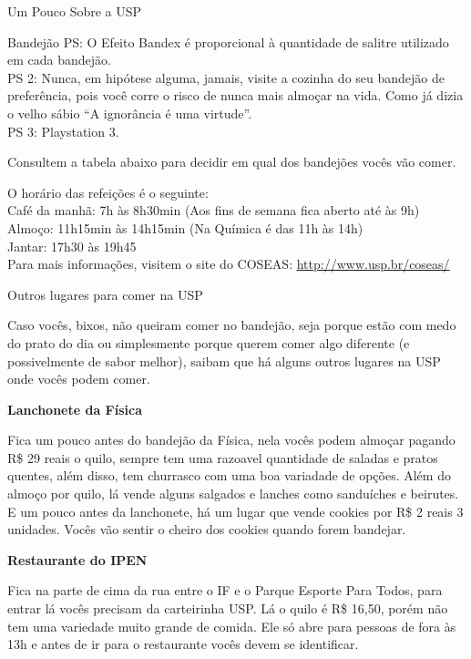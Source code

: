 \begin{secao}{Um Pouco Sobre a USP}
\begin{subsecao}{Bandejão}
PS: O Efeito Bandex é proporcional à quantidade de salitre utilizado em cada bandejão.\\
PS 2: Nunca, em hipótese alguma, jamais, visite a cozinha do seu bandejão de preferência,
pois você corre o risco de nunca mais almoçar na vida. Como já dizia o velho sábio ``A
ignorância é uma virtude''.\\
PS 3: Playstation 3.

Consultem a tabela abaixo para decidir em qual dos bandejões vocês vão comer.

O horário das refeições é o seguinte:\\
Café da manhã: 7h às 8h30min (Aos fins de semana fica aberto até às 9h)\\
Almoço: 11h15min às 14h15min (Na Química é das 11h às 14h)\\
Jantar: 17h30 às 19h45\\

Para mais informações, visitem o site do COSEAS: \href{http://www.usp.br/coseas/COSEASHP/COSEAS2010_restaurantes.html}{http://www.usp.br/coseas/}
\pagebreak

\end{subsecao}

\begin{subsecao}{Outros lugares para comer na USP}

Caso vocês, bixos, não queiram comer no bandejão, seja porque estão com medo do prato do dia
ou simplesmente porque querem comer algo diferente (e possivelmente de sabor melhor), saibam
que há alguns outros lugares na USP onde vocês podem comer.

{\bf Lanchonete da Física}

Fica um pouco antes do bandejão da Física, nela vocês podem almoçar pagando R\$ 29 reais o
quilo, sempre tem uma razoavel quantidade de saladas e pratos quentes, além disso, tem
churrasco com uma boa variadade de opções.
Além do almoço por quilo, lá vende alguns salgados e lanches como sanduíches e beirutes.
E um pouco antes da lanchonete, há um lugar que vende cookies por R\$ 2 reais 3 unidades.
Vocês vão sentir o cheiro dos cookies quando forem bandejar.

{\bf Restaurante do IPEN}

Fica na parte de cima da rua entre o IF e o Parque Esporte Para Todos, para entrar lá vocês
precisam da carteirinha USP. Lá o quilo é R\$ 16,50, porém não tem uma variedade muito grande
de comida. Ele só abre para pessoas de fora às 13h e antes de ir para o restaurante vocês devem
se identificar.


\end{subsecao}
\end{secao}
